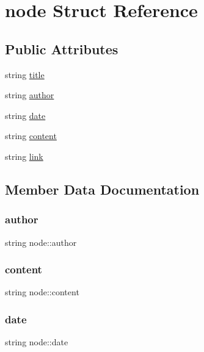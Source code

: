 \hypertarget{structnode}{}\section{node Struct Reference}
\label{structnode}
\subsection*{Public Attributes}
\begin{DoxyCompactItemize}
\item 
string \hyperlink{structnode_a79b31177c413f7066ba1e0e9dc203c05}{title}
\item 
string \hyperlink{structnode_a17fe4a03b75213946eda4002d36d45c1}{author}
\item 
string \hyperlink{structnode_a9e241352faba467dce6ee6a3f32979a1}{date}
\item 
string \hyperlink{structnode_aef41938c1d67b81199e8f0625f51025a}{content}
\item 
string \hyperlink{structnode_a3ce953da0e17204565cb4599ca6a584e}{link}
\end{DoxyCompactItemize}


\subsection{Member Data Documentation}
\hypertarget{structnode_a17fe4a03b75213946eda4002d36d45c1}{}\label{structnode_a17fe4a03b75213946eda4002d36d45c1} 
\subsubsection{\texorpdfstring{author}{author}}
{\footnotesize\ttfamily string node\+::author}

\hypertarget{structnode_aef41938c1d67b81199e8f0625f51025a}{}\label{structnode_aef41938c1d67b81199e8f0625f51025a} 
\subsubsection{\texorpdfstring{content}{content}}
{\footnotesize\ttfamily string node\+::content}

\hypertarget{structnode_a9e241352faba467dce6ee6a3f32979a1}{}\label{structnode_a9e241352faba467dce6ee6a3f32979a1} 
\subsubsection{\texorpdfstring{date}{date}}
{\footnotesize\ttfamily string node\+::date}

